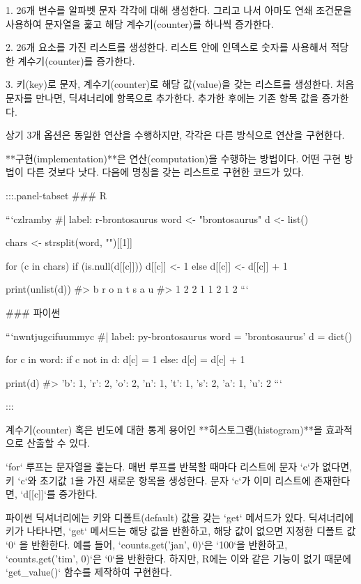 \documentclass[
  letterpaper,
]{book}
\begin{document}
{1.  26개 변수를 알파벳 문자 각각에 대해 생성한다. 그리고 나서 아마도 연쇄 조건문을 사용하여 문자열을 훑고 해당 계수기(counter)를 하나씩 증가한다.

2.  26개 요소를 가진 리스트를 생성한다. 리스트 안에 인덱스로 숫자를 사용해서 적당한 계수기(counter)를 증가한다.

3.  키(key)로 문자, 계수기(counter)로 해당 값(value)을 갖는 리스트를 생성한다. 처음 문자를 만나면, 딕셔너리에 항목으로 추가한다. 추가한 후에는 기존 항목 값을 증가한다.

상기 3개 옵션은 동일한 연산을 수행하지만, 각각은 다른 방식으로 연산을 구현한다.

**구현(implementation)**은 연산(computation)을 수행하는 방법이다. 어떤 구현 방법이 다른 것보다 낫다. 다음에 명칭을 갖는 리스트로 구현한 코드가 있다.

:::{.panel-tabset}
### R

```czlramby
#| label: r-brontosaurus
word <- "brontosaurus"
d <- list()

chars <- strsplit(word, "")[[1]]

for (c in chars) {
  if (is.null(d[[c]])) {
    d[[c]] <- 1
  } else {
    d[[c]] <- d[[c]] + 1
  }
}

print(unlist(d))
#> b r o n t s a u 
#> 1 2 2 1 1 2 1 2 
```

### 파이썬

```nwntjugcifuummyc
#| label: py-brontosaurus
word = 'brontosaurus'
d = dict()

for c in word:
  if c not in d:
    d[c] = 1
  else:
    d[c] = d[c] + 1

print(d)
#> {'b': 1, 'r': 2, 'o': 2, 'n': 1, 't': 1, 's': 2, 'a': 1, 'u': 2}
```

:::

계수기(counter) 혹은 빈도에 대한 통계 용어인 **히스토그램(histogram)**을
효과적으로 산출할 수 있다.

`for` 루프는 문자열을 훑는다. 매번 루프를 반복할 때마다 리스트에 문자 `c`가 없다면, 
키 `c`와 초기값 1을 가진 새로운 항목을 생성한다. 
문자 `c`가 이미 리스트에 존재한다면, `d[[c]]`를 증가한다.

파이썬 딕셔너리에는 키와 디폴트(default) 값을 갖는 `get` 메서드가 있다. 딕셔너리에 키가 나타나면, 
`get` 메서드는 해당 값을 반환하고, 해당 값이 없으면 지정한 디폴트 값 `0` 을 반환한다. 
예를 들어, `counts.get('jan', 0)`은 `100`을 반환하고, 
`counts.get('tim', 0)`은 `0`을 반환한다. 
하지만, R에는 이와 같은 기능이 없기 때문에 `get_value()` 함수를 제작하여 구현한다.

}
\end{document}
